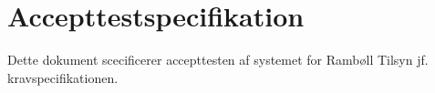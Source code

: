 \chapter{Accepttestspecifikation}
Dette dokument scecificerer accepttesten af systemet for Rambøll Tilsyn jf. kravspecifikationen.











